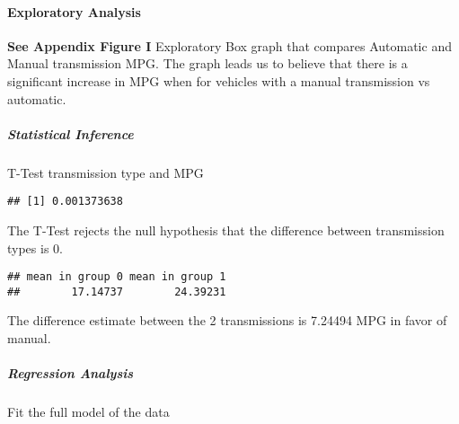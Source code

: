 \documentclass[
]{article}
\newenvironment{Shaded}{\begin{snugshade}}{\end{snugshade}}
\newcommand{\CommentTok}[1]{\textcolor[rgb]{0.56,0.35,0.01}{\textit{#1}}}
\newcommand{\DataTypeTok}[1]{\textcolor[rgb]{0.13,0.29,0.53}{#1}}
\newcommand{\KeywordTok}[1]{\textcolor[rgb]{0.13,0.29,0.53}{\textbf{#1}}}
\newcommand{\NormalTok}[1]{#1}
\newcommand{\OperatorTok}[1]{\textcolor[rgb]{0.81,0.36,0.00}{\textbf{#1}}}
\newcommand{\StringTok}[1]{\textcolor[rgb]{0.31,0.60,0.02}{#1}}
\begin{document}
\hypertarget{exploratory-analysis}{%
\paragraph{Exploratory Analysis}\label{exploratory-analysis}}

\textbf{See Appendix Figure I} Exploratory Box graph that compares
Automatic and Manual transmission MPG. The graph leads us to believe
that there is a significant increase in MPG when for vehicles with a
manual transmission vs automatic.

\hypertarget{statistical-inference}{%
\subparagraph{Statistical Inference}\label{statistical-inference}}

T-Test transmission type and MPG

\begin{Shaded}
\end{Shaded}

\begin{verbatim}
## [1] 0.001373638
\end{verbatim}

The T-Test rejects the null hypothesis that the difference between
transmission types is 0.

\begin{Shaded}
\end{Shaded}

\begin{verbatim}
## mean in group 0 mean in group 1 
##        17.14737        24.39231
\end{verbatim}

The difference estimate between the 2 transmissions is 7.24494 MPG in
favor of manual.

\hypertarget{regression-analysis}{%
\subparagraph{Regression Analysis}\label{regression-analysis}}

Fit the full model of the data

\begin{Shaded}
\end{Shaded}
\end{document}
